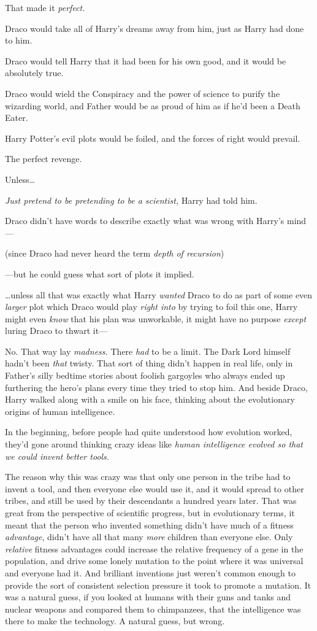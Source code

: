 That made it \emph{perfect.}

Draco would take all of Harry's dreams away from him, just as Harry had done to
him.

Draco would tell Harry that it had been for his own good, and it would be
absolutely true.

Draco would wield the Conspiracy and the power of science to purify the
wizarding world, and Father would be as proud of him as if he'd been a Death
Eater.

Harry Potter's evil plots would be foiled, and the forces of right would
prevail.

The perfect revenge.

Unless{\ldots}

\emph{Just pretend to be pretending to be a scientist,} Harry had told him.

Draco didn't have words to describe exactly what was wrong with Harry's mind---

(since Draco had never heard the term \emph{depth of recursion})

---but he could guess what sort of plots it implied.

{\ldots}unless all that was exactly what Harry \emph{wanted} Draco to do as
part of some even \emph{larger} plot which Draco would play \emph{right into}
by trying to foil this one, Harry might even \emph{know} that his plan was
unworkable, it might have no purpose \emph{except} luring Draco to thwart it---

No. That way lay \emph{madness.} There \emph{had} to be a limit. The Dark Lord
himself hadn't been \emph{that} twisty. That sort of thing didn't happen in
real life, only in Father's silly bedtime stories about foolish gargoyles who
always ended up furthering the hero's plans every time they tried to stop him.
\later
And beside Draco, Harry walked along with a smile on his face, thinking about
the evolutionary origins of human intelligence.

In the beginning, before people had quite understood how evolution worked,
they'd gone around thinking crazy ideas like \emph{human intelligence evolved
so that we could invent better tools.}

The reason why this was crazy was that only one person in the tribe had to
invent a tool, and then everyone else would use it, and it would spread to
other tribes, and still be used by their descendants a hundred years later.
That was great from the perspective of scientific progress, but in evolutionary
terms, it meant that the person who invented something didn't have much of a
fitness \emph{advantage}, didn't have all that many \emph{more} children than
everyone else. Only \emph{relative} fitness advantages could increase the
relative frequency of a gene in the population, and drive some lonely mutation
to the point where it was universal and everyone had it. And brilliant
inventions just weren't common enough to provide the sort of consistent
selection pressure it took to promote a mutation. It was a natural guess, if
you looked at humans with their guns and tanks and nuclear weapons and compared
them to chimpanzees, that the intelligence was there to make the technology. A
natural guess, but wrong.

